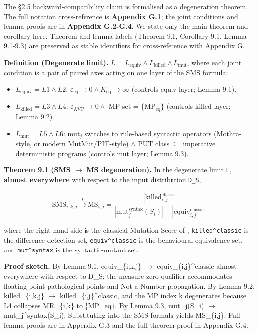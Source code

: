 \documentclass[review,12pt,authoryear]{elsarticle}
\providecommand{\tightlist}{\setlength{\itemsep}{0pt}\setlength{\parskip}{0pt}}
\begin{document}
The §2.5 backward-compatibility claim is formalised as a degeneration
theorem. The full notation cross-reference is \textbf{Appendix G.1}; the
joint conditions and lemma proofs are in \textbf{Appendix G.2-G.4}. We
state only the main theorem and corollary here. Theorem and lemma labels
(Theorem 9.1, Corollary 9.1, Lemma 9.1-9.3) are preserved as stable
identifiers for cross-reference with Appendix G.

\textbf{Definition (Degenerate limit).}
$L = L_{\mathrm{equiv}} \wedge L_{\mathrm{killed}} \wedge L_{\mathrm{mut}}$, where each joint
condition is a pair of paired axes acting on one layer of the SMS
formula:

\begin{itemize}
\tightlist
\item
  $L_{\mathrm{equiv}} = L1 \wedge L2$: $\varepsilon_{\mathrm{eq}} \to 0 \wedge K_{\mathrm{eq}} \to \infty$ (controls equiv
  layer; Lemma 9.1).
\item
  $L_{\mathrm{killed}} = L3 \wedge L4$: $\varepsilon_{\mathrm{AVP}} \to 0 \wedge$ MP set = $\{\mathrm{MP}_{\mathrm{eq}}\}$
  (controls killed layer; Lemma 9.2).
\item
  $L_{\mathrm{mut}} = L5 \wedge L6$: $\mathrm{mut}_j$ switches to rule-based syntactic
  operators (Mothra-style, or modern MutMut/PIT-style) $\wedge$ PUT class $\subseteq$ imperative deterministic
  programs (controls mut layer; Lemma 9.3).
\end{itemize}

\textbf{Theorem 9.1 (SMS $\to$ MS degeneration).} In the degenerate limit
\texttt{L}, \textbf{almost everywhere} with respect to the input
distribution \texttt{D\_S},

\[ \mathrm{SMS}_{i,k,j} \xrightarrow{L} \mathrm{MS}_{i,j} = \frac{|\mathrm{killed}_{i,j}^{\mathrm{classic}}|}{|\mathrm{mut}_j^{\mathrm{syntax}}(S_i)| - |\mathrm{equiv}_{i,j}^{\mathrm{classic}}|} \]

where the right-hand side is the classical Mutation Score of
\citet{d7c38286734419b52de4262c9802ebdfcf4b9447}, \texttt{killed\^{}classic} is the difference-detection
set, \texttt{equiv\^{}classic} is the behavioural-equivalence set, and
\texttt{mut\^{}syntax} is the syntactic-mutant set.

\textbf{Proof sketch.} By Lemma 9.1, equiv\_\{i,k,j\} $\to$
equiv\_\{i,j\}\^{}classic almost everywhere with respect to D\_S; the
measure-zero qualifier accommodates floating-point pathological points
and Not-a-Number propagation. By Lemma 9.2, killed\_\{i,k,j\} $\to$
killed\_\{i,j\}\^{}classic, and the MP index k degenerates because L4
collapses MR\_\{i,k\} to \{MP\_eq\}. By Lemma 9.3, mut\_j(S\_i) $\to$
mut\_j\^{}syntax(S\_i). Substituting into the SMS formula yields
MS\_\{i,j\}. Full lemma proofs are in Appendix G.3 and the full theorem
proof in Appendix G.4.
\end{document}
